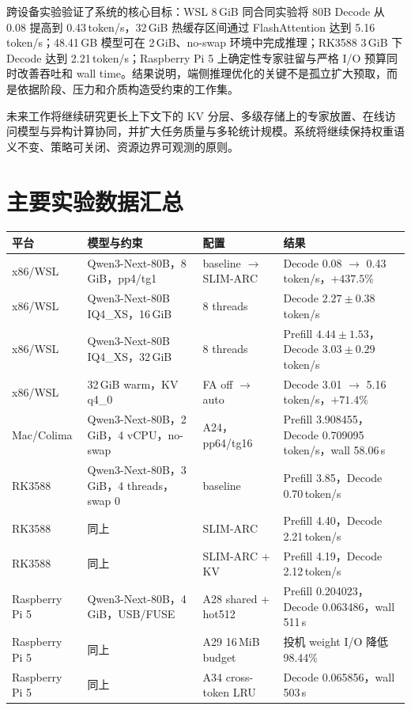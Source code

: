 \documentclass[a4paper]{article}
\begin{document}
跨设备实验验证了系统的核心目标：WSL 8\,GiB 同合同实验将 80B Decode 从 0.08 提高到 0.43\,token/s，32\,GiB 热缓存区间通过 FlashAttention 达到 5.16\,token/s；48.41\,GB 模型可在 2\,GiB、no-swap 环境中完成推理；RK3588 3\,GiB 下 Decode 达到 2.21\,token/s；Raspberry Pi 5 上确定性专家驻留与严格 I/O 预算同时改善吞吐和 wall time。结果说明，端侧推理优化的关键不是孤立扩大预取，而是依据阶段、压力和介质构造受约束的工作集。

未来工作将继续研究更长上下文下的 KV 分层、多级存储上的专家放置、在线访问模型与异构计算协同，并扩大任务质量与多轮统计规模。系统将继续保持权重语义不变、策略可关闭、资源边界可观测的原则。

\newpage
\appendix
\section{主要实验数据汇总}

\begin{longtable}{p{}p{}p{}p{}}
\toprule
平台 & 模型与约束 & 配置 & 结果 \\
\midrule
x86/WSL & Qwen3-Next-80B，8\,GiB，pp4/tg1 & baseline $\rightarrow$ SLIM-ARC & Decode 0.08 $\rightarrow$ 0.43\,token/s，$+437.5\%$ \\
x86/WSL & Qwen3-Next-80B IQ4\_XS，16\,GiB & 8 threads & Decode $2.27\pm0.38$\,token/s \\
x86/WSL & Qwen3-Next-80B IQ4\_XS，32\,GiB & 8 threads & Prefill $4.44\pm1.53$，Decode $3.03\pm0.29$\,token/s \\
x86/WSL & 32\,GiB warm，KV q4\_0 & FA off $\rightarrow$ auto & Decode 3.01 $\rightarrow$ 5.16\,token/s，$+71.4\%$ \\
Mac/Colima & Qwen3-Next-80B，2\,GiB，4 vCPU，no-swap & A24，pp64/tg16 & Prefill 3.908455，Decode 0.709095\,token/s，wall 58.06\,s \\
RK3588 & Qwen3-Next-80B，3\,GiB，4 threads，swap 0 & baseline & Prefill 3.85，Decode 0.70\,token/s \\
RK3588 & 同上 & SLIM-ARC & Prefill 4.40，Decode 2.21\,token/s \\
RK3588 & 同上 & SLIM-ARC + KV & Prefill 4.19，Decode 2.12\,token/s \\
Raspberry Pi 5 & Qwen3-Next-80B，4\,GiB，USB/FUSE & A28 shared + hot512 & Prefill 0.204023，Decode 0.063486，wall 511\,s \\
Raspberry Pi 5 & 同上 & A29 16\,MiB budget & 投机 weight I/O 降低 98.44\% \\
Raspberry Pi 5 & 同上 & A34 cross-token LRU & Decode 0.065856，wall 503\,s \\
\bottomrule
\end{longtable}
\end{document}
